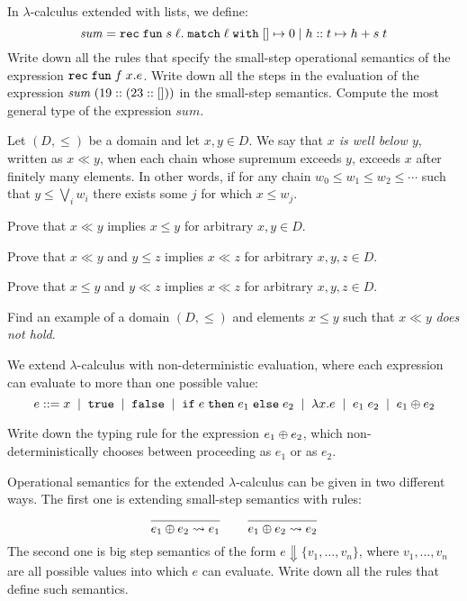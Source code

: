 \documentclass[arhiv]{izpit}
\begin{document}

\naloga[\tocke{20}]

In $\lambda$-calculus extended with lists, we define:
\[
  \mathit{sum} = \mathtt{rec}\;\mathtt{fun}\;s\;\ell. \;\mathtt{match}\;\ell\;\mathtt{with} \; [] \mapsto {0} \; | \; {h \mathrel{::} t} \mapsto {h + s \; t}
\]
\podnaloga Write down all the rules that specify the small-step operational semantics of the expression $\mathtt{rec}\;\mathtt{fun}\;f\;x. e$.
\podnaloga Write down all the steps in the evaluation of the expression $\mathit{sum} \; (19 \mathrel{::} (23 \mathrel{::} []))$ in the small-step semantics.
\podnaloga Compute the most general type of the expression $\mathit{sum}$.
\nadaljevanje


\naloga[\tocke{20}]

Let $(D, \leq)$ be a domain and let $x, y \in D$. We say that \emph{$x$ is well below $y$}, written as $x \ll y$, when each chain whose supremum exceeds $y$, exceeds $x$ after finitely many elements. In other words, if for any chain $w_0 \leq w_1 \leq w_2 \leq \cdots$ such that $y \leq \bigvee_i w_i$ there exists some $j$ for which $x \leq w_j$.

\podnaloga
Prove that $x \ll y$ implies $x \leq y$ for arbitrary $x, y \in D$.

\podnaloga
Prove that $x \ll y$ and $y \leq z$ implies $x \ll z$ for arbitrary $x, y, z \in D$.

\podnaloga
Prove that $x \leq y$ and $y \ll z$ implies $x \ll z$ for arbitrary $x, y, z \in D$.

\podnaloga
Find an example of a domain $(D, \leq)$ and elements $x \leq y$ such that $x \ll y$ \emph{does not hold}.

\nadaljevanje


\naloga[\tocke{20}]
We extend $\lambda$-calculus with non-deterministic evaluation, where each expression can evaluate to more than one possible value:
\[
  e \mathrel{{:}{:}{=}}
  x \;\mid\;
  \mathtt{true} \;\mid\;
  \mathtt{false} \;\mid\;
  \mathtt{if}\;e\;\mathtt{then}\;e_1\;\mathtt{else}\;e_2 \;\mid\;
  \lambda x. e \;\mid\;
  e_1 \; e_2 \;\mid\;
  e_1 \oplus e_2
\]

\podnaloga
Write down the typing rule for the expression $e_1 \oplus e_2$, which non-deterministically chooses between proceeding as $e_1$ or as $e_2$.

\podnaloga
Operational semantics for the extended $\lambda$-calculus can be given in two different ways. The first one is extending small-step semantics with rules:
\[
\frac{
  \hbox{}
}{
  e_1 \oplus e_2 \leadsto e_1
}
\qquad
\frac{
  \hbox{}
}{
  e_1 \oplus e_2 \leadsto e_2
}
\]
The second one is big step semantics of the form $e \Downarrow \{v_1, \dots, v_n\}$, where $v_1, \dots, v_n$ are all possible values into which $e$ can evaluate. Write down all the rules that define such semantics.
\end{document}
